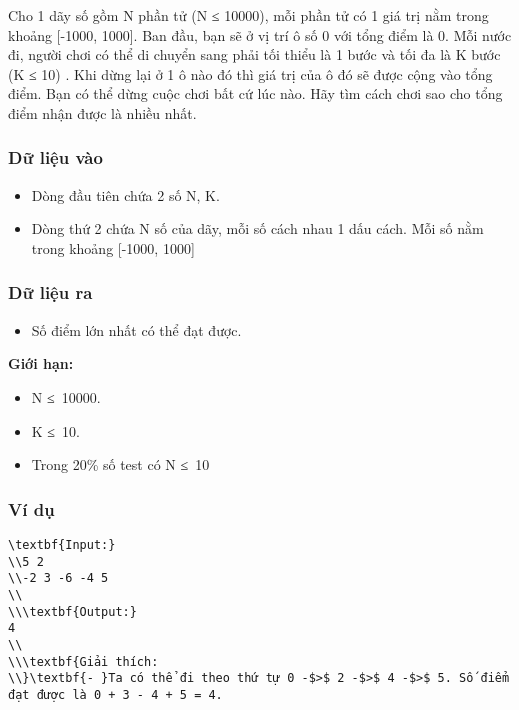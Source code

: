 



   Cho 1 dãy số gồm N phần tử (N ≤ 10000), mỗi phần tử có 1 giá trị nằm trong khoảng [-1000, 1000]. Ban đầu, bạn sẽ ở vị trí ô số 0 với tổng điểm là 0. Mỗi nước đi, người chơi có thể di chuyển sang phải tối thiểu là 1 bước và tối đa là K bước (K ≤ 10) . Khi dừng lại ở 1 ô nào đó thì giá trị của ô đó sẽ được cộng vào tổng điểm. Bạn có thể dừng cuộc chơi bất cứ lúc nào. Hãy tìm cách chơi sao cho tổng điểm nhận được là nhiều nhất.  

\subsubsection{   Dữ liệu vào  }
\begin{itemize}
	\item     Dòng đầu tiên chứa 2 số N, K.   
\end{itemize}
\begin{itemize}
	\item     Dòng thứ 2 chứa N số của dãy, mỗi số cách nhau 1 dấu cách. Mỗi số nằm trong khoảng [-1000, 1000]   
\end{itemize}

\subsubsection{   Dữ liệu ra  }
\begin{itemize}
	\item     Số điểm lớn nhất có thể đạt được.   
\end{itemize}

\textbf{    Giới hạn:   }
\begin{itemize}
	\item     N ≤ 10000.   
	\item     K ≤ 10.   
	\item     Trong 20\% số test có N ≤ 10   
\end{itemize}

\subsubsection{   Ví dụ  }
\begin{verbatim}
\textbf{Input:}
\\5 2
\\-2 3 -6 -4 5
\\
\\\textbf{Output:}
4
\\
\\\textbf{Giải thích:
\\}\textbf{- }Ta có thể đi theo thứ tự 0 -$>$ 2 -$>$ 4 -$>$ 5. Số điểm đạt được là 0 + 3 - 4 + 5 = 4.\end{verbatim}